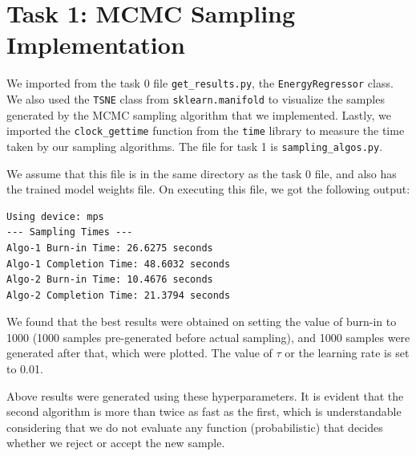 \documentclass{article}
\begin{document}
\section{Task 1: MCMC Sampling Implementation}
We imported from the task 0 file \texttt{get\_results.py}, the \texttt{EnergyRegressor} class. We also used the \texttt{TSNE} class from \texttt{sklearn.manifold} to visualize the samples generated by the MCMC sampling algorithm that we implemented. Lastly, we imported the \texttt{clock\_gettime} function from the \texttt{time} library to measure the time taken by our sampling algorithms. The file for task 1 is \texttt{sampling\_algos.py}.

We assume that this file is in the same directory as the task 0 file, and also has the trained model weights file. On executing this file, we got the following output:
\begin{lstlisting}
Using device: mps
--- Sampling Times ---
Algo-1 Burn-in Time: 26.6275 seconds
Algo-1 Completion Time: 48.6032 seconds
Algo-2 Burn-in Time: 10.4676 seconds
Algo-2 Completion Time: 21.3794 seconds
\end{lstlisting}

We found that the best results were obtained on setting the value of burn-in to 1000 (1000 samples pre-generated before actual sampling), and 1000 samples were generated after that, which were plotted. The value of $\tau$ or the learning rate is set to 0.01.

Above results were generated using these hyperparameters. It is evident that the second algorithm is more than twice as fast as the first, which is understandable considering that we do not evaluate any function (probabilistic) that decides whether we reject or accept the new sample.
\end{document}
